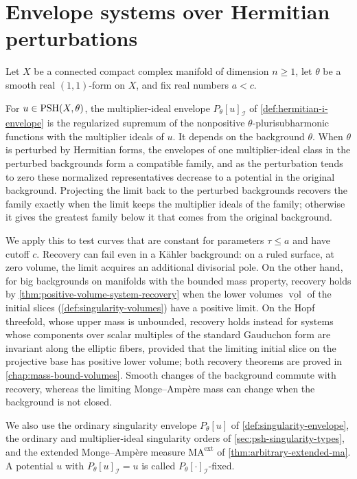 \chapter{Envelope systems over Hermitian perturbations}
\label{chap:hermitian-envelope-systems}

Let $X$ be a connected compact complex manifold of dimension $n\geq1$, let $\theta$ be a smooth real $(1,1)$-form on $X$, and fix real numbers $a<c$.

For $u\in\mathrm{PSH}(X,\theta)$, the multiplier-ideal envelope $P_\theta[u]_{\mathcal I}$ of \cref{def:hermitian-i-envelope} is the regularized supremum of the nonpositive $\theta$-plurisubharmonic functions with the multiplier ideals of $u$. It depends on the background $\theta$. When $\theta$ is perturbed by Hermitian forms, the envelopes of one multiplier-ideal class in the perturbed backgrounds form a compatible family, and as the perturbation tends to zero these normalized representatives decrease to a potential in the original background. Projecting the limit back to the perturbed backgrounds recovers the family exactly when the limit keeps the multiplier ideals of the family; otherwise it gives the greatest family below it that comes from the original background.

We apply this to test curves that are constant for parameters $\tau\leq a$ and have cutoff $c$. Recovery can fail even in a K\"ahler background: on a ruled surface, at zero volume, the limit acquires an additional divisorial pole. On the other hand, for big backgrounds on manifolds with the bounded mass property, recovery holds by \cref{thm:positive-volume-system-recovery} when the lower volumes $\underline{\operatorname{vol}}$ of the initial slices (\cref{def:singularity-volumes}) have a positive limit. On the Hopf threefold, whose upper mass is unbounded, recovery holds instead for systems whose components over scalar multiples of the standard Gauduchon form are invariant along the elliptic fibers, provided that the limiting initial slice on the projective base has positive lower volume; both recovery theorems are proved in \cref{chap:mass-bound-volumes}. Smooth changes of the background commute with recovery, whereas the limiting Monge--Amp\`ere mass can change when the background is not closed.

We also use the ordinary singularity envelope $P_\theta[u]$ of \cref{def:singularity-envelope}, the ordinary and multiplier-ideal singularity orders of \cref{sec:psh-singularity-types}, and the extended Monge--Amp\`ere measure $\mathrm{MA}^{\mathrm{ext}}$ of \cref{thm:arbitrary-extended-ma}. A potential $u$ with $P_\theta[u]_{\mathcal I}=u$ is called $P_\theta[\cdot]_{\mathcal I}$-fixed.

